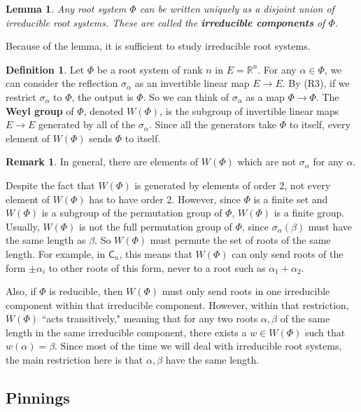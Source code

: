 \documentclass[12pt]{article}
\newtheorem{lemma}[theorem]{Lemma}
\theoremstyle{definition}
\newtheorem{definition}[theorem]{Definition}
\newtheorem{remark}[theorem]{Remark}
\numberwithin{theorem}{subsection}
\newcommand{\R}{\mathbb{R}}
\newcommand{\sig}{\sigma}
\newcommand{\tbf}{\textbf}
\newcommand{\noi}{\noindent}
\begin{document}
\begin{lemma}
Any root system $\Phi$ can be written uniquely as a disjoint union of irreducible root systems. These are called the \tbf{irreducible components} of $\Phi$.
\end{lemma}

\noi Because of the lemma, it is sufficient to study irreducible root systems.

\begin{definition}
Let $\Phi$ be a root system of rank $n$ in $E = \R^n$. For any $\alpha \in \Phi$, we can consider the reflection $\sig_\alpha$ as an invertible linear map $E \to E$. By (R3), if we restrict $\sig_\alpha$ to $\Phi$, the output is $\Phi$. So we can think of $\sig_\alpha$ as a map $\Phi \to \Phi$. The \tbf{Weyl group} of $\Phi$, denoted $W(\Phi)$, is the subgroup of invertible linear maps $E \to E$ generated by all of the $\sig_\alpha$. Since all the generators take $\Phi$ to itself, every element of $W(\Phi)$ sends $\Phi$ to itself. 
\end{definition}

\begin{remark}
In general, there are elements of $W(\Phi)$ which are not $\sig_\alpha$ for any $\alpha$. 

Despite the fact that $W(\Phi)$ is generated by elements of order 2, not every element of $W(\Phi)$ has to have order 2. However, since $\Phi$ is a finite set and $W(\Phi)$ is a subgroup of the permutation group of $\Phi$, $W(\Phi)$ is a finite group. Usually, $W(\Phi)$ is not the full permutation group of $\Phi$, since $\sig_\alpha(\beta)$ must have the same length as $\beta$. So $W(\Phi)$ must permute the set of roots of the same length. For example, in $\mathsf{C}_n$, this means that $W(\Phi)$ can only send roots of the form $\pm \alpha_i$ to other roots of this form, never to a root such as $\alpha_1 + \alpha_2$. 

Also, if $\Phi$ is reducible, then $W(\Phi)$ must only send roots in one irreducible component within that irreducible component. However, within that restriction, $W(\Phi)$ ``acts transitively," meaning that for any two roots $\alpha, \beta$ of the same length in the same irreducible component, there exists a $w \in W(\Phi)$ such that $w(\alpha) = \beta$. Since most of the time we will deal with irreducible root systems, the main restriction here is that $\alpha, \beta$ have the same length.
\end{remark}

\subsection{Pinnings}
\label{pinnings}
\end{document}
